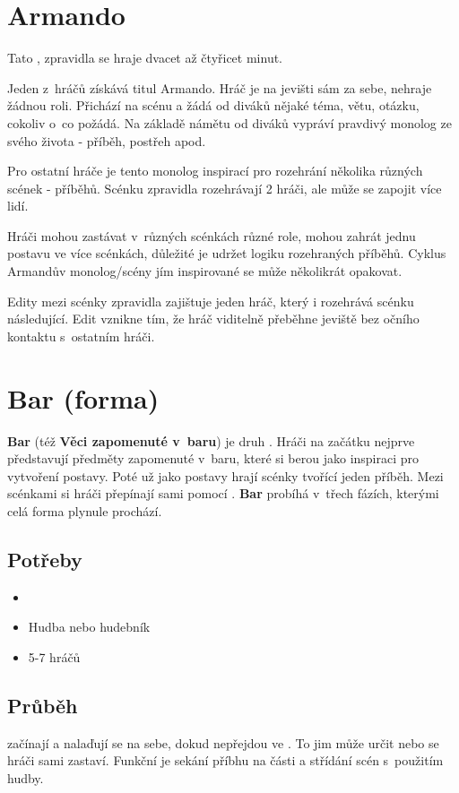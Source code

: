 \needspace{5cm} \section{Armando} \label{armando} Tato , zpravidla se hraje dvacet až čtyřicet minut. 
 
Jeden z~hráčů získává titul  Armando. Hráč je na jevišti sám za sebe, nehraje žádnou roli. Přichází na  scénu a žádá od diváků nějaké téma, větu, otázku, cokoliv o~co požádá. 
Na základě námětu od diváků vypráví pravdivý monolog ze svého života  - příběh, postřeh apod. 
 
Pro ostatní hráče je tento monolog inspirací pro rozehrání několika různých scének - příběhů. Scénku zpravidla rozehrávají 2 hráči, ale může se zapojit více lidí. 
 
Hráči mohou zastávat v~různých scénkách různé role, mohou zahrát jednu postavu ve více scénkách, důležité je udržet logiku rozehraných příběhů. 
Cyklus Armandův monolog/scény jím inspirované se může několikrát opakovat. 
 
Edity mezi scénky zpravidla zajištuje jeden hráč, který i rozehrává scénku následující. Edit vznikne tím, že hráč viditelně přeběhne jeviště bez očního kontaktu s~ostatním hráči. 
 
 
\needspace{5cm} \section{Bar (forma)} \label{bar (forma)} \textbf{Bar}  (též \textbf{Věci zapomenuté v~baru}) je druh . Hráči na začátku nejprve představují předměty zapomenuté v~baru, které si berou jako inspiraci pro vytvoření postavy. Poté už jako postavy hrají scénky tvořící jeden příběh. Mezi scénkami si hráči přepínají sami pomocí . \textbf{Bar} probíhá v~třech fázích, kterými celá forma plynule prochází. 
 
\subsection{ Potřeby } \begin{itemize}
\item  {}
\item  Hudba nebo hudebník
\item  5-7 hráčů
\end{itemize}
 
\subsection{ Průběh }  začínají  a nalaďují se na sebe, dokud nepřejdou ve . To jim může určit  nebo se hráči sami zastaví.  
Funkční je sekání příbhu na části a střídání scén s~použitím hudby. 
 
